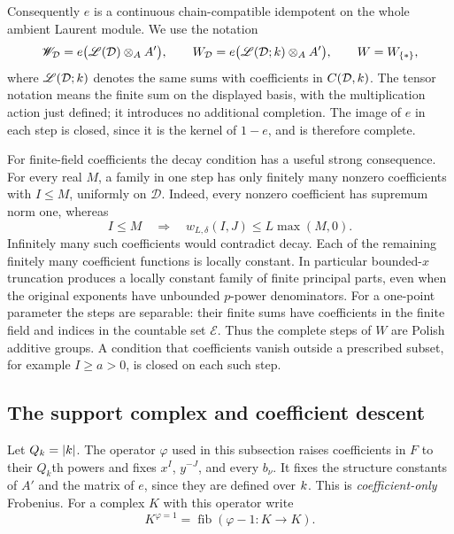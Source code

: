 Consequently $e$ is a continuous chain-compatible idempotent on the
whole ambient Laurent module.  We use the notation
\[
 \mathscr W_{\mathcal D}
   =e\bigl(\mathscr L(\mathcal D)\otimes_A A'\bigr),
 \qquad
 W_{\mathcal D}
   =e\bigl(\mathscr L(\mathcal D;k)\otimes_A A'\bigr),
 \qquad W=W_{\{*\}},
\]
where $\mathscr L(\mathcal D;k)$ denotes the same sums with
coefficients in $C(\mathcal D,k)$.  The tensor notation means the
finite sum on the displayed basis, with the multiplication action just
defined; it introduces no additional completion.  The image of $e$ in
each step is closed, since it is the kernel of $1-e$, and is therefore
complete.

For finite-field coefficients the decay condition has a useful strong
consequence.  For every real $M$, a family in one step has only finitely
many nonzero coefficients with $I\leq M$, uniformly on $\mathcal D$.
Indeed, every nonzero coefficient has supremum norm one, whereas
\[
 I\leq M\quad\Longrightarrow\quad
 w_{L,\delta}(I,J)\leq L\max(M,0).
\]
Infinitely many such coefficients would contradict decay.  Each of the
remaining finitely many coefficient functions is locally constant.
In particular bounded-$x$ truncation produces a locally constant family
of finite principal parts, even when the original exponents have
unbounded $p$-power denominators.  For a one-point parameter the steps
are separable: their finite sums have coefficients in the finite field
and indices in the countable set $\mathcal E$.  Thus the complete steps
of $W$ are Polish additive groups.  A condition that coefficients vanish
outside a prescribed subset, for example $I\geq a>0$, is closed on each
such step.

\subsection{The support complex and coefficient descent}

Let $Q_k=|k|$.  The operator $\varphi$ used in this subsection raises
coefficients in $F$ to their $Q_k$th powers and fixes $x^I$, $y^{-J}$,
and every $b_\nu$.  It fixes the structure constants of $A'$ and the
matrix of $e$, since they are defined over $k$.  This is
\emph{coefficient-only} Frobenius.  For a complex $K$ with this operator
write
\[
 K^{\varphi=1}=\operatorname{fib}(\varphi-1:K\longrightarrow K).
\]

